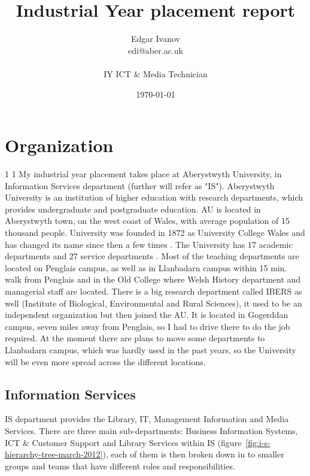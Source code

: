 \documentclass[10pt,a4paper,headinclude=true]{report}
\begin{document}
\onehalfspacing
\title{Industrial Year placement report}
\author{Edgar Ivanov\\ edi@aber.ac.uk \\ \\ IY ICT \& Media Technician}
\date{\today}

\maketitle
\tableofcontents

\chapter{Organization}
1
1
My industrial year placement takes place at Aberystwyth University, in Information Services department (further will refer as "IS"). Aberystwyth University is an institution of higher education with research departments, which provides undergraduate and postgraduate education. AU is located in Aberystwyth town, on the west coast of Wales, with average population of 15 thousand people. University was founded in 1872 as University College Wales and has changed its name since then a few times \cite{History}.
The University has 17 academic departments and 27 service departments \cite{Departments} \cite{Departments2}. Most of the teaching departments are located on Penglais campus, as well as in Llanbadarn campus within 15 min. walk from Penglais and in the Old College where Welsh History department and managerial staff are located. There is a big research department called IBERS as well (Institute of Biological, Environmental and Rural Sciences), it used to be an independent organization but then joined the AU. It is located in Gogerddan campus, seven miles away from Penglais, so I had to drive there to do the job required. At the moment there are plans to move some departments to Llanbadarn campus, which was hardly used in the past years, so the University will be even more spread across the different locations.

\section{Information Services}
IS department provides the Library, IT, Management Information and Media Services. There are three main sub-departments: Business Information Systems, ICT \& Customer Support and Library Services within IS (figure~\ref{fig:i-s-hierarchy-tree-march-2012}), each of them is then broken down in to smaller groups and teams that have different roles and responsibilities.
\end{document}
